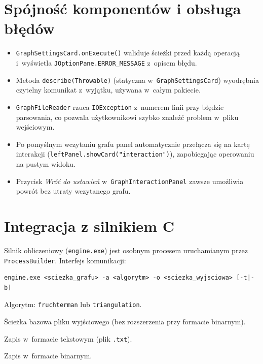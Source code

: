 \documentclass[12pt]{article}
\begin{document}
\section{Spójność komponentów i obsługa błędów}

\begin{itemize}
    \item \texttt{GraphSettingsCard.onExecute()} waliduje ścieżki przed
          każdą operacją i~wyświetla \texttt{JOptionPane.ERROR\_MESSAGE}
          z~opisem błędu.
    \item Metoda \texttt{describe(Throwable)} (statyczna w~\texttt{GraphSettingsCard})
          wyodrębnia czytelny komunikat z~wyjątku, używana w~całym pakiecie.
    \item \texttt{GraphFileReader} rzuca \texttt{IOException} z~numerem linii
          przy błędzie parsowania, co pozwala użytkownikowi szybko znaleźć
          problem w~pliku wejściowym.
    \item Po pomyślnym wczytaniu grafu panel automatycznie przełącza się na
          kartę interakcji (\texttt{leftPanel.showCard("interaction")}),
          zapobiegając operowaniu na pustym widoku.
    \item Przycisk \emph{Wróć do ustawień} w~\texttt{GraphInteractionPanel}
          zawsze umożliwia powrót bez utraty wczytanego grafu.
\end{itemize}

\section{Integracja z silnikiem C}

Silnik obliczeniowy (\texttt{engine.exe}) jest osobnym procesem uruchamianym
przez \texttt{ProcessBuilder}. Interfejs komunikacji:

\begin{lstlisting}
engine.exe <sciezka_grafu> -a <algorytm> -o <sciezka_wyjsciowa> [-t|-b]
\end{lstlisting}

\begin{description}[leftmargin=3cm, style=nextline]
    \item[\texttt{-a}] Algorytm: \texttt{fruchterman} lub \texttt{triangulation}.
    \item[\texttt{-o}] Ścieżka bazowa pliku wyjściowego (bez rozszerzenia
         przy formacie binarnym).
    \item[\texttt{-t}] Zapis w~formacie tekstowym (plik \texttt{.txt}).
    \item[\texttt{-b}] Zapis w~formacie binarnym.
\end{description}
\end{document}
